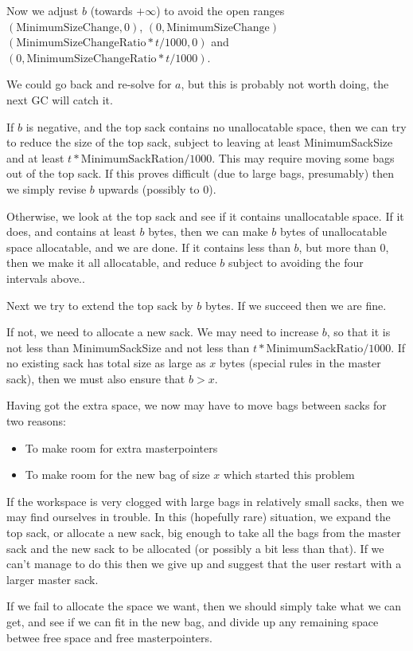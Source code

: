 \documentclass[12pt]{article}
\begin{document}
Now we adjust $b$ (towards $+\infty$) to avoid the open ranges
$(\mbox{MinimumSizeChange},0)$, $(0,\mbox{MinimumSizeChange})$
$(\mbox{MinimumSizeChangeRatio}*t/1000,0)$ and
$(0,\mbox{MinimumSizeChangeRatio}*t/1000)$.

We could go back and re-solve for $a$, but this is probably not worth
doing, the next GC will catch it.

If $b$ is negative, and the top sack contains no unallocatable space,
then we can try to reduce the size of the top sack, subject to leaving 
at least MinimumSackSize and at least
$t*\mbox{MinimumSackRation}/1000$. This may require moving some
bags out of the top sack. If this proves difficult (due to large bags, 
presumably) then we simply revise $b$ upwards (possibly to 0).


Otherwise, we look at the top sack and see if it contains unallocatable
space. If it does, and contains at least $b$ bytes, then we can make
$b$ bytes of unallocatable space allocatable, and we are done. If it
contains less than $b$, but more than 0, then we make it all
allocatable, and reduce $b$ subject to avoiding the four intervals above.. 

Next we try to extend the top sack by $b$ bytes. If we succeed then we 
are fine.

If not, we need to allocate a new sack. We may need to increase $b$,
so that it is not less than MinimumSackSize and not less than
$t*\mbox{MinimumSackRatio}/1000$. If no existing sack has total size
as large as $x$ bytes (special rules in the master sack), then we must 
also ensure that $b > x$.

Having got the extra space, we now may have to move bags between sacks 
for two reasons:
\begin{itemize}
\item To make room for extra masterpointers
\item To make room for the new bag of size $x$ which started this
problem
\end{itemize}

If the workspace is very clogged with large bags in relatively small
sacks, then we may find ourselves in trouble. In this (hopefully rare)
situation, we expand the top sack, or allocate a new sack, big enough
to take all the bags from the master sack and the new sack to be
allocated (or possibly a bit less than that).  If we can't manage to
do this then we give up and suggest that the user restart with a
larger master sack.



If we fail to allocate the space we want, then we should simply take
what we can get, and see if we can fit in the new bag, and divide up
any remaining space betwee free space and free masterpointers.
\end{document}
